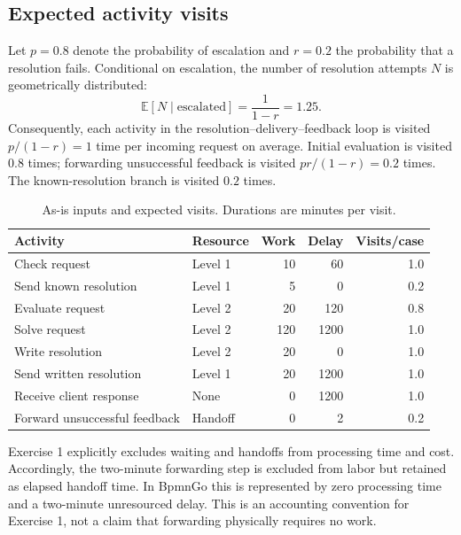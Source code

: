 \documentclass[10pt,a4paper]{article}
\begin{document}
\subsection{Expected activity visits}
Let $p=0.8$ denote the probability of escalation and $r=0.2$ the probability that a
resolution fails. Conditional on escalation, the number of resolution attempts $N$
is geometrically distributed:
\[
 \mathbb{E}[N\mid\text{escalated}]=\frac{1}{1-r}=1.25.
\]
Consequently, each activity in the resolution--delivery--feedback loop is visited
$p/(1-r)=1$ time per incoming request on average. Initial evaluation is visited
$0.8$ times; forwarding unsuccessful feedback is visited $pr/(1-r)=0.2$ times.
The known-resolution branch is visited $0.2$ times.

\begin{table}[htbp]
\centering\small
\caption{As-is inputs and expected visits. Durations are minutes per visit.}
\label{tab:asis-inputs}
\begin{tabularx}{\linewidth}{Ylrrr}
\toprule
Activity & Resource & Work & Delay & Visits/case\\
\midrule
Check request & Level 1 & 10 & 60 & 1.0\\
Send known resolution & Level 1 & 5 & 0 & 0.2\\
Evaluate request & Level 2 & 20 & 120 & 0.8\\
Solve request & Level 2 & 120 & 1200 & 1.0\\
Write resolution & Level 2 & 20 & 0 & 1.0\\
Send written resolution & Level 1 & 20 & 1200 & 1.0\\
Receive client response & None & 0 & 1200 & 1.0\\
Forward unsuccessful feedback & Handoff & 0 & 2 & 0.2\\
\bottomrule
\end{tabularx}
\end{table}

Exercise 1 explicitly excludes waiting and handoffs from processing time and cost.
Accordingly, the two-minute forwarding step is excluded from labor but retained as
elapsed handoff time. In BpmnGo this is represented by zero processing time and a
two-minute unresourced delay. This is an accounting convention for Exercise 1,
not a claim that forwarding physically requires no work.
\end{document}
